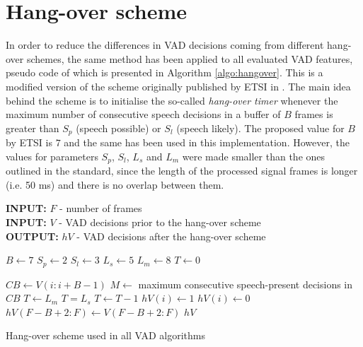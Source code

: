 
\section{Hang-over scheme}

In order to reduce the differences in VAD decisions coming from different hang-over schemes, the same method has been applied to all evaluated VAD features, pseudo code of which is presented in Algorithm \ref{algo:hangover}. This is a modified version of the scheme originally published by ETSI in \cite{ETSIHangover}. The main idea behind the scheme is to initialise the so-called \emph{hang-over timer} whenever the maximum number of consecutive speech decisions in a buffer of $B$ frames is greater than $S_p$ (speech possible) or $S_l$ (speech likely). The proposed value for $B$ by ETSI is $7$ and the same has been used in this implementation. However, the values for parameters $S_p$, $S_l$, $L_s$ and $L_m$ were made smaller than the ones outlined in the standard, since the length of the processed signal frames is longer (i.e. 50 ms) and there is no overlap between them.

\begin{algorithm}
\textbf{INPUT:} $F$ - number of frames \\
\textbf{INPUT:} $V$ - VAD decisions prior to the hang-over scheme \\
\textbf{OUTPUT:} $hV$ - VAD decisions after the hang-over scheme
\begin{algorithmic}[1]
\STATE $B \leftarrow 7$ 
\STATE $S_p \leftarrow 2$  
\STATE $S_l \leftarrow 3$ 
\STATE $L_s \leftarrow 5$ 
\STATE $L_m \leftarrow 8$ 
\STATE
\STATE $T \leftarrow 0$ 

\STATE $CB \leftarrow V(i:i+B-1)$ 
\STATE $M \leftarrow$ maximum consecutive speech-present decisions in $CB$
\STATE $T \leftarrow L_m$
\STATE $T = L_s$
\STATE $T \leftarrow T-1$
\ENDIF
{}
\STATE $hV(i) \leftarrow 1$
\ELSE
\STATE $hV(i) \leftarrow 0$
\ENDIF
\ENDFOR
\STATE $hV(F-B+2:F) \leftarrow V(F-B+2:F)$ 
\RETURN $hV$
\end{algorithmic}
\caption{Hang-over scheme used in all VAD algorithms}
\label{algo:hangover}
\end{algorithm}


